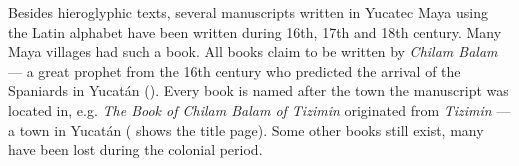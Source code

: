 \documentclass[../main.tex]{subfiles}
\begin{document}
Besides hieroglyphic texts, several manuscripts written in Yucatec Maya using the Latin alphabet 
have been written  during 16th, 17th and 18th century.
Many Maya villages had such a book.
All books claim to be written by \emph{Chilam Balam} --- a great prophet from the 16th century
who predicted the arrival of the Spaniards in Yucat\'{a}n
().
Every book is named after the town the manuscript was located in, e.g. 
\emph{The Book of Chilam Balam of Tizimin} originated from \emph{Tizimin} --- a town 
in Yucat\'{a}n
( shows the title page).
Some other books still exist, many have been lost during the colonial period.
\end{document}
